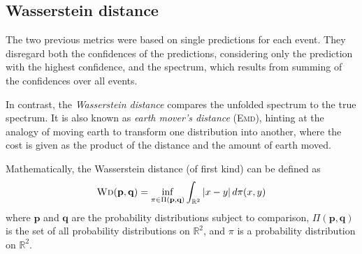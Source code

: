 \subsection{Wasserstein distance}
The two previous metrics were based on single predictions for each event.
They disregard both
  the confidences of the predictions,
    considering only the prediction with the highest confidence,
  and the spectrum,
    which results from summing of the confidences over all events.

In contrast,
the \emph{Wasserstein distance} \cite{wd}
compares the unfolded spectrum to the true spectrum.
%
It is also known as \emph{earth mover's distance} (\textsc{Emd}),
  hinting at the analogy of moving earth to transform one distribution into another,
    where the cost is given as the product of the distance and the amount of earth moved.

Mathematically, the Wasserstein distance (of first kind) can be defined as
\begin{equation}
  \text{\textsc{Wd}}(\mathbf{p}, \mathbf{q}) = \inf_{\pi \in \Pi(\mathbf{p}, \mathbf{q})} \int_{\mathbb{R}^2} |x - y| \, d\pi(x, y)
\end{equation}
where
  $\mathbf{p}$ and $\mathbf{q}$ are the probability distributions subject to comparison,
  $\Pi(\mathbf{p}, \mathbf{q})$ is the set of all probability distributions on $\mathbb{R}^2$,
  and $\pi$ is a probability distribution on $\mathbb{R}^2$.
